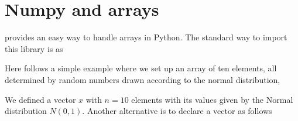 \documentclass[letterpaper,10pt,english]{sphinxmanual}
\begin{document}
\section{Numpy and arrays}
\label{\detokenize{chapter1:numpy-and-arrays}}
 provides an easy way to handle arrays in Python. The standard way to import this library is as

\begin{sphinxVerbatim}[commandchars=\\\{\}]
   
\end{sphinxVerbatim}

Here follows a simple example where we set up an array of ten elements, all determined by random numbers drawn according to the normal distribution,

\begin{sphinxVerbatim}[commandchars=\\\{\}]
  
  
\end{sphinxVerbatim}

\begin{sphinxVerbatim}
\end{sphinxVerbatim}

We defined a vector \(x\) with \(n=10\) elements with its values given by the Normal distribution \(N(0,1)\).
Another alternative is to declare a vector as follows

\begin{sphinxVerbatim}[commandchars=\\\{\}]
   
  \PYG{p}{[}  \PYG{p}{]}
\end{sphinxVerbatim}

\begin{sphinxVerbatim}[commandchars=\\\{\}]
[1 2 3]
\end{sphinxVerbatim}
\end{document}
